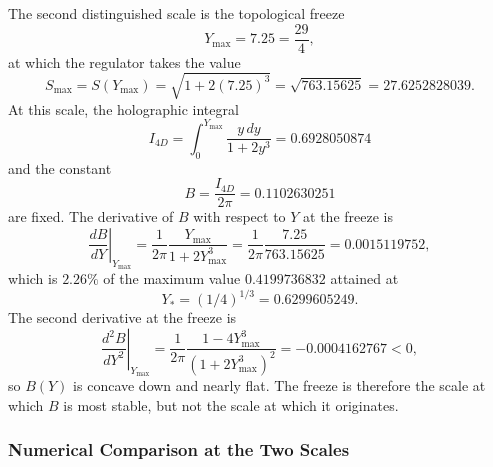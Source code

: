 \documentclass[a4paper,1pt,oneside,openany]{book}
\begin{document}
The second distinguished scale is the topological freeze
\begin{equation}
Y_{\max} = 7.25 = \frac{29}{4},
\label{eq:Ymax-lock}
\end{equation}
at which the regulator takes the value
\begin{equation}
S_{\max} = S(Y_{\max}) = \sqrt{1 + 2(7.25)^3} = \sqrt{763.15625} = 27.6252828039.
\label{eq:Smax-lock}
\end{equation}
At this scale, the holographic integral
\begin{equation}
I_{4D} = \int_0^{Y_{\max}} \frac{y\,dy}{1 + 2y^3} = 0.6928050874
\label{eq:I4D-lock}
\end{equation}
and the constant
\begin{equation}
B = \frac{I_{4D}}{2\pi} = 0.1102630251
\label{eq:B-lock}
\end{equation}
are fixed. The derivative of $B$ with respect to $Y$ at the freeze is
\begin{equation}
\left.\frac{dB}{dY}\right|_{Y_{\max}} = \frac{1}{2\pi}\frac{Y_{\max}}{1 + 2Y_{\max}^3} = \frac{1}{2\pi}\frac{7.25}{763.15625} = 0.0015119752,
\label{eq:dBdY-lock}
\end{equation}
which is $2.26\%$ of the maximum value $0.4199736832$ attained at
\begin{equation}
Y_* = (1/4)^{1/3} = 0.6299605249.
\label{eq:Ystar}
\end{equation}
The second derivative at the freeze is
\begin{equation}
\left.\frac{d^2B}{dY^2}\right|_{Y_{\max}} = \frac{1}{2\pi}\frac{1 - 4Y_{\max}^3}{(1 + 2Y_{\max}^3)^2} = -0.0004162767 < 0,
\label{eq:d2BdY2-lock}
\end{equation}
so $B(Y)$ is concave down and nearly flat. The freeze is therefore the scale at which $B$ is most stable, but not the scale at which it originates.

\subsubsection{Numerical Comparison at the Two Scales}
\end{document}
